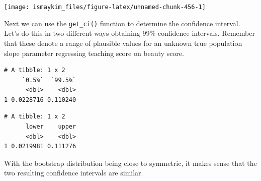 \documentclass[12pt, krantz2,]{krantz}
\makeatletter
\newenvironment{Shaded}{\begin{snugshade}}{\end{snugshade}}
\newcommand{\DataTypeTok}[1]{\textcolor[rgb]{0.27,0.27,0.27}{#1}}
\newcommand{\FloatTok}[1]{\textcolor[rgb]{0.06,0.06,0.06}{#1}}
\newcommand{\KeywordTok}[1]{\textcolor[rgb]{0.27,0.27,0.27}{\textbf{#1}}}
\newcommand{\NormalTok}[1]{#1}
\newcommand{\OperatorTok}[1]{\textcolor[rgb]{0.43,0.43,0.43}{\textbf{#1}}}
\newcommand{\StringTok}[1]{\textcolor[rgb]{0.5,0.5,0.5}{#1}}
\newenvironment{kframe}{%
\medskip{}
\setlength{\fboxsep}{.8em}
 \def\at@end@of@kframe{}%
 \ifinner\ifhmode%
  \def\at@end@of@kframe{\end{minipage}}%
  \begin{minipage}{\columnwidth}%
 \fi\fi%
 \def\FrameCommand##1{\hskip\@totalleftmargin \hskip-\fboxsep
 \colorbox{shadecolor}{##1}\hskip-\fboxsep
     \hskip-\linewidth \hskip-\@totalleftmargin \hskip\columnwidth}%
 \MakeFramed {\advance\hsize-\width
   \@totalleftmargin\z@ \linewidth\hsize
   \@setminipage}}%
 {\par\unskip\endMakeFramed%
 \at@end@of@kframe}
\renewenvironment{Shaded}{\begin{kframe}}{\end{kframe}}
\makeatother
\begin{document}
\begin{Shaded}
\end{Shaded}

\begin{center}\texttt{[image: ismaykim\_files/figure-latex/unnamed-chunk-456-1]} \end{center}

Next we can use the \texttt{get\_ci()} function to determine the confidence interval. Let's do this in two different ways obtaining 99\% confidence intervals. Remember that these denote a range of plausible values for an unknown true population slope parameter regressing teaching score on beauty score.

\begin{Shaded}
\end{Shaded}

\begin{verbatim}
# A tibble: 1 x 2
     `0.5%`  `99.5%`
      <dbl>    <dbl>
1 0.0228716 0.110240
\end{verbatim}

\begin{Shaded}
\end{Shaded}

\begin{verbatim}
# A tibble: 1 x 2
      lower    upper
      <dbl>    <dbl>
1 0.0219981 0.111276
\end{verbatim}

With the bootstrap distribution being close to symmetric, it makes sense that the two resulting confidence intervals are similar.
\end{document}
